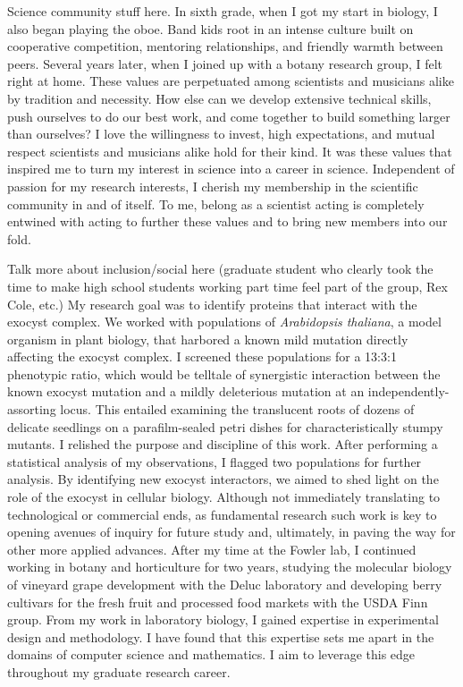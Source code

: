 Science community stuff here.
In sixth grade, when I got my start in biology, I also began playing the oboe.
Band kids root in an intense culture built on cooperative competition, mentoring relationships, and friendly warmth between peers.
Several years later, when I joined up with a botany research group, I felt right at home.
These values are perpetuated among scientists and musicians alike by tradition and necessity.
How else can we develop extensive technical skills, push ourselves to do our best work, and come together to build something larger than ourselves?
I love the willingness to invest, high expectations, and mutual respect scientists and musicians alike hold for their kind.
It was these values that inspired me to turn my interest in science into a career in science.
Independent of passion for my research interests, I cherish my membership in the scientific community in and of itself.
To me, belong as a scientist acting is completely entwined with acting to further these values and to bring new members into our fold.

Talk more about inclusion/social here (graduate student who clearly took the time to make high school students working part time feel part of the group, Rex Cole, etc.)
My research goal was to identify proteins that interact with the exocyst complex.
We worked with populations of \textit{Arabidopsis thaliana}, a model organism in plant biology, that harbored a known mild mutation directly affecting the exocyst complex.
I screened these populations for a 13:3:1 phenotypic ratio, which would be telltale of synergistic interaction between the known exocyst mutation and a mildly deleterious mutation at an independently-assorting locus.
This entailed examining the translucent roots of dozens of delicate seedlings on a parafilm-sealed petri dishes for characteristically stumpy mutants.
I relished the purpose and discipline of this work.
After performing a statistical analysis of my observations, I flagged two populations for further analysis.
By identifying new exocyst interactors, we aimed to shed light on the role of the exocyst in cellular biology.
Although not immediately translating to technological or commercial ends, as fundamental research such work is key to opening avenues of inquiry for future study and, ultimately, in paving the way for other more applied advances.
After my time at the Fowler lab, I continued working in botany and horticulture for two years, studying the molecular biology of vineyard grape development with the Deluc laboratory and developing berry cultivars for the fresh fruit and processed food markets with the USDA Finn group.
From my work in laboratory biology, I gained expertise in experimental design and methodology.
I have found that this expertise sets me apart in the domains of computer science and mathematics.
I aim to leverage this edge throughout my graduate research career.


